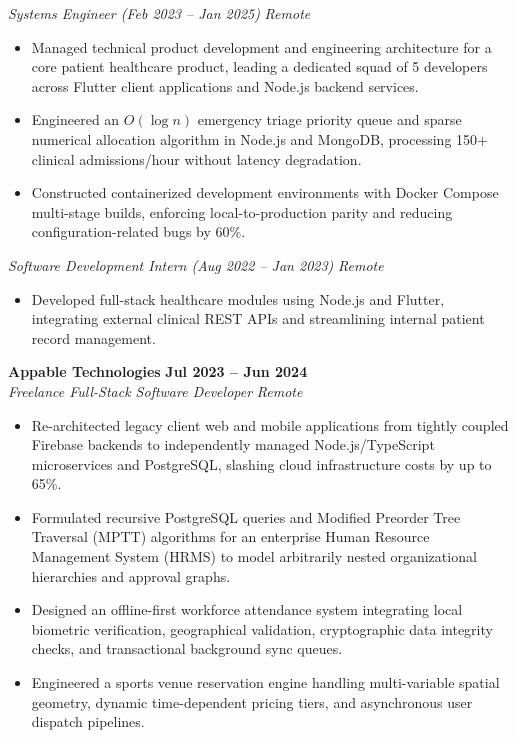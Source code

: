 \documentclass[10pt,a4paper]{article}
\begin{document}
\textit{Systems Engineer (Feb 2023 – Jan 2025)} \hfill \textit{Remote}
\begin{itemize}
  \item Managed technical product development and engineering architecture for a core patient healthcare product, leading a dedicated squad of 5 developers across Flutter client applications and Node.js backend services.
  \item Engineered an $O(\log n)$ emergency triage priority queue and sparse numerical allocation algorithm in Node.js and MongoDB, processing 150+ clinical admissions/hour without latency degradation.
  \item Constructed containerized development environments with Docker Compose multi-stage builds, enforcing local-to-production parity and reducing configuration-related bugs by 60\%.
\end{itemize}

\textit{Software Development Intern (Aug 2022 – Jan 2023)} \hfill \textit{Remote}
\begin{itemize}
  \item Developed full-stack healthcare modules using Node.js and Flutter, integrating external clinical REST APIs and streamlining internal patient record management.
\end{itemize}

\vspace{4pt}
\textbf{Appable Technologies} \hfill \textbf{Jul 2023 – Jun 2024} \\
\textit{Freelance Full-Stack Software Developer} \hfill \textit{Remote}
\begin{itemize}
  \item Re-architected legacy client web and mobile applications from tightly coupled Firebase backends to independently managed Node.js/TypeScript microservices and PostgreSQL, slashing cloud infrastructure costs by up to 65\%.
  \item Formulated recursive PostgreSQL queries and Modified Preorder Tree Traversal (MPTT) algorithms for an enterprise Human Resource Management System (HRMS) to model arbitrarily nested organizational hierarchies and approval graphs.
  \item Designed an offline-first workforce attendance system integrating local biometric verification, geographical validation, cryptographic data integrity checks, and transactional background sync queues.
  \item Engineered a sports venue reservation engine handling multi-variable spatial geometry, dynamic time-dependent pricing tiers, and asynchronous user dispatch pipelines.
\end{itemize}
\end{document}
